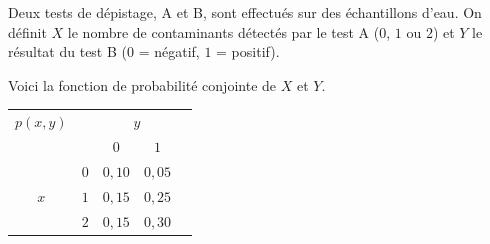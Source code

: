 \begin{questions}
\pageblanche


\question Deux tests de dépistage, A et B, sont effectués sur des échantillons d'eau. On définit \(X\) le nombre de contaminants détectés par le test A (\(0\), \(1\) ou \(2\)) et \(Y\) le résultat du test B (\(0\) = négatif, \(1\) = positif).

Voici la fonction de probabilité conjointe de \(X\) et \(Y\).

\begin{center}
\begin{tabular}{cc|cc|c}
$p(x,y)$ & & \multicolumn{2}{c|}{$y$} & \\
 & & $0$ & $1$ & \\
\hline
 & $0$ & $0{,}10$ & $0{,}05$ & \\
$x$ & $1$ & $0{,}15$ & $0{,}25$ & \\
 & $2$ & $0{,}15$ & $0{,}30$ & \\
\hline
\end{tabular}
\end{center}

\end{questions}
